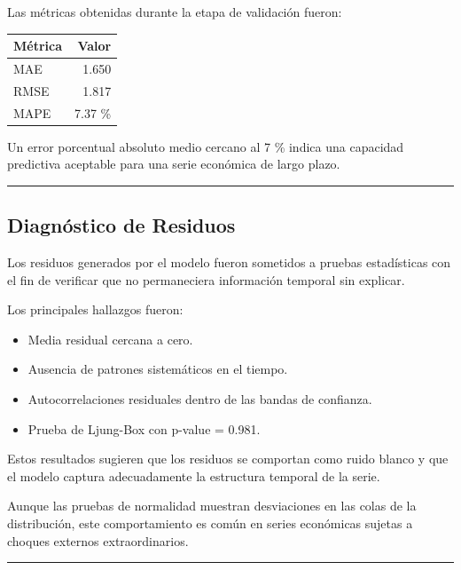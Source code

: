 \documentclass[11pt]{article}
\providecommand{\tightlist}{%
      \setlength{\itemsep}{0pt}\setlength{\parskip}{0pt}}
\begin{document}
Las métricas obtenidas durante la etapa de validación fueron:

\begin{longtable}[]{@{}lr@{}}
\toprule\noalign{}
Métrica & Valor \\
\midrule\noalign{}
\endhead
\bottomrule\noalign{}
\endlastfoot
MAE & 1.650 \\
RMSE & 1.817 \\
MAPE & 7.37 \% \\
\end{longtable}

Un error porcentual absoluto medio cercano al 7 \% indica una capacidad
predictiva aceptable para una serie económica de largo plazo.

\begin{center}\rule{0.5\linewidth}{0.5pt}\end{center}

\hypertarget{diagnuxf3stico-de-residuos}{%
\subsection{Diagnóstico de Residuos}\label{diagnuxf3stico-de-residuos}}

Los residuos generados por el modelo fueron sometidos a pruebas
estadísticas con el fin de verificar que no permaneciera información
temporal sin explicar.

Los principales hallazgos fueron:

\begin{itemize}
\tightlist
\item
  Media residual cercana a cero.
\item
  Ausencia de patrones sistemáticos en el tiempo.
\item
  Autocorrelaciones residuales dentro de las bandas de confianza.
\item
  Prueba de Ljung-Box con p-value = 0.981.
\end{itemize}

Estos resultados sugieren que los residuos se comportan como ruido
blanco y que el modelo captura adecuadamente la estructura temporal de
la serie.

Aunque las pruebas de normalidad muestran desviaciones en las colas de
la distribución, este comportamiento es común en series económicas
sujetas a choques externos extraordinarios.

\begin{center}\rule{0.5\linewidth}{0.5pt}\end{center}
\end{document}
